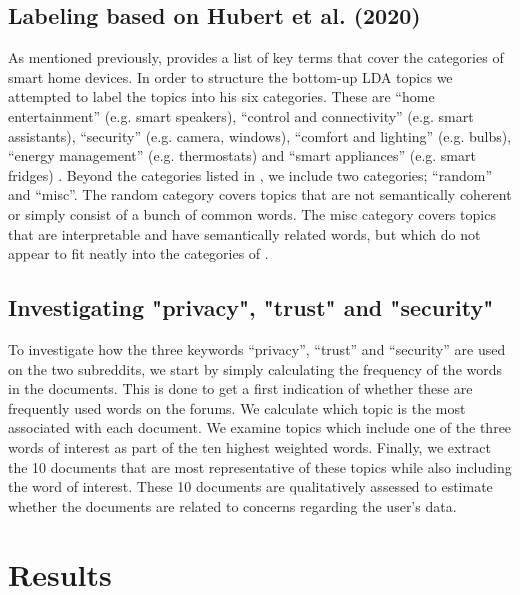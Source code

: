 \documentclass{article}
\begin{document}
    \subsection{Labeling based on Hubert et al. (2020)}
    As mentioned previously,  provides a list of key terms that cover the categories of smart home devices. In order to structure the bottom-up LDA topics we attempted to label the topics into his six categories. These are “home entertainment” (e.g. smart speakers), “control and connectivity” (e.g. smart assistants), “security” (e.g. camera, windows), “comfort and lighting” (e.g. bulbs), “energy management” (e.g. thermostats) and “smart appliances” (e.g. smart fridges) \cite[p. 1]{hubert2020take}. Beyond the categories listed in , we include two categories; “random” and “misc”. The random category covers topics that are not semantically coherent or simply consist of a bunch of common words. The misc category covers topics that are interpretable and have semantically related words, but which do not appear to fit neatly into the categories of .  
    
    \subsection{Investigating "privacy", "trust" and "security"}
    To investigate how the three keywords “privacy”, “trust” and “security” are used on the two subreddits, we start by simply calculating the frequency of the words in the documents. This is done to get a first indication of whether these are frequently used words on the forums. We calculate which topic is the most associated with each document. We examine topics which include one of the three words of interest as part of the ten highest weighted words. Finally, we extract the 10 documents that are most representative of these topics while also including the word of interest. These 10 documents are qualitatively assessed to estimate whether the documents are related to concerns regarding the user's data. 
    \section{Results}
\end{document}
